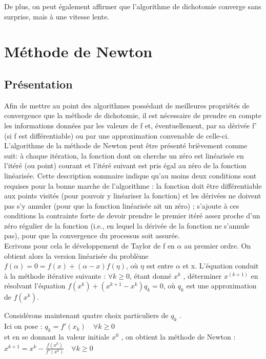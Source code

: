 \documentclass{article}
\begin{document}
De plus, on peut également affirmer que l'algorithme de dichotomie converge sans surprise, mais à une vitesse lente. 
\section{Méthode de Newton}
\subsection{Présentation} 
\quad Afin de mettre au point des algorithmes possédant de meilleures propriétés de convergence que la méthode de dichotomie, il est nécessaire de prendre en
compte les informations données par les valeurs de f et, éventuellement, par sa dérivée f' (si f est différentiable) ou par une approximation convenable de celle-ci.\\
 L'algorithme de la méthode de Newton peut être présenté brièvement comme suit: à chaque itération, la fonction dont on cherche un zéro est linéarisée en l'itéré (ou point) courant et l'itéré suivant est pris égal au zéro de la fonction linéarisée. Cette description sommaire indique qu'au moins deux conditions sont requises pour la bonne marche de l'algorithme : la fonction doit être différentiable aux points visités (pour pouvoir y linéariser la fonction) et les dérivées ne doivent pas s'y annuler (pour que la fonction linéarisée ait un zéro) ; s'ajoute à ces conditions la contrainte forte de devoir prendre le premier itéré assez proche d'un zéro régulier de la fonction (i.e., en lequel la dérivée de la fonction ne s'annule pas), pour que la convergence du processus soit assurée. \\


Ecrivons pour cela le développement de Taylor de f en $\alpha$  au premier ordre.
On obtient alors la version linéarisée du problème
$f(\alpha) = 0 = f(x) + (\alpha−x)f(\eta)$,
où $\eta$ est entre $\alpha$ et x. L’équation  conduit à la méthode itérative suivante :
$\forall k \geq 0$, étant donné $x^k$ , déterminer $x^(k+1)$ en résolvant l’équation
$ f(x^k) + (x^{k+1}-x^k)q_k = 0$, où $q_k$ est une approximation de $f(x^k)$.

\quadd Considérons maintenant quatre choix particuliers de $q_k$ . \\
\quadd Ici on pose : \quad $q_k=f'(x_k)  \quad \forall k\geq 0$ \\ et en se donnant la valeur initiale $x^0$ , on obtient la méthode de Newton : \\
    \quadd $x^{k+1} = x^k - \frac{f(x^k)}{f'(x^k)} \quad \forall k\geq 0$ \\
\end{document}
